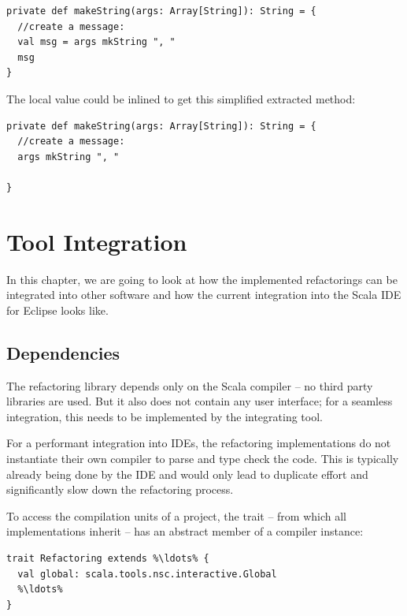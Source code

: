 \documentclass[10pt,a4paper,oneside]{scrreprt}
\begin{document}
\begin{lstlisting}
private def makeString(args: Array[String]): String = {
  //create a message:
  val msg = args mkString ", "
  msg
}
\end{lstlisting}

The local value  could be inlined to get this simplified extracted method:

\begin{lstlisting}
private def makeString(args: Array[String]): String = {
  //create a message:
  args mkString ", "

}
\end{lstlisting}

\label{end-chapter:implemented-refactorings}

\emptypage

\chapter{Tool Integration} \label{chapter:tool-integration}

In this chapter, we are going to look at how the implemented refactorings can be integrated into other software and how the current integration into the Scala IDE for Eclipse looks like.

\section{Dependencies}

The refactoring library depends only on the Scala compiler -- no third party libraries are used. But it also does not contain any user interface; for a seamless integration, this needs to be implemented by the integrating tool.

For a performant integration into IDEs, the refactoring implementations do not instantiate their own compiler to parse and type check the code. This is typically already being done by the IDE and would only lead to duplicate effort and significantly slow down the refactoring process.

To access the compilation units of a project, the  trait -- from which all implementations inherit -- has an abstract member of a compiler instance:

\begin{lstlisting}
trait Refactoring extends %\ldots% {
  val global: scala.tools.nsc.interactive.Global
  %\ldots% 
}
\end{lstlisting}
\end{document}
